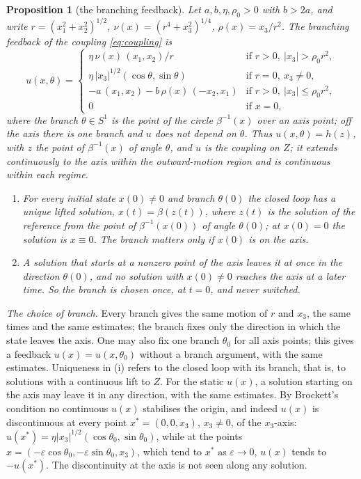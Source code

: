 \documentclass[11pt,reqno]{amsart}
\theoremstyle{plain}
\newtheorem*{proposition}{Proposition}
\theoremstyle{definition}
\theoremstyle{remark}
\begin{document}
\begin{proposition}[the branching feedback]
Let $a,b,\eta,\rho_0>0$ with $b>2a$, and write $r=(x_1^{2}+x_2^{2})^{1/2}$,
$\nu(x)=(r^{4}+x_3^{2})^{1/4}$, $\rho(x)=x_3/r^{2}$. The branching feedback of the coupling
\eqref{eq:coupling} is
\begin{equation}\label{eq:branchfb}
  u(x,\theta)=\begin{cases}
    \eta\,\nu(x)\,(x_1,x_2)/r & \text{if } r>0,\ |x_3|>\rho_0r^{2},\\[0.5ex]
    \eta\,|x_3|^{1/2}(\cos\theta,\sin\theta) & \text{if } r=0,\ x_3\neq0,\\[0.5ex]
    -a\,(x_1,x_2)-b\,\rho(x)\,(-x_2,x_1) & \text{if } r>0,\ |x_3|\le\rho_0r^{2},\\[0.5ex]
    0 & \text{if } x=0,
  \end{cases}
\end{equation}
where the branch $\theta\in S^{1}$ is the point of the circle $\beta^{-1}(x)$ over an axis point; off the axis
there is one branch and $u$ does not depend on $\theta$. Thus $u(x,\theta)=h(z)$, with $z$ the point of
$\beta^{-1}(x)$ of angle $\theta$, and $u$ is the coupling on $Z$; it extends continuously to the axis within the outward-motion region and is
continuous within each regime.
\begin{enumerate}
\item[\textup{(i)}] For every initial state $x(0)\ne0$ and branch $\theta(0)$ the closed loop has a unique
      lifted solution, $x(t)=\beta(z(t))$, where $z(t)$ is the solution of the reference from the point of
      $\beta^{-1}(x(0))$ of angle $\theta(0)$; at $x(0)=0$ the solution is $x\equiv0$. The branch matters only if $x(0)$ is on the axis.
\item[\textup{(ii)}] A solution that starts at a nonzero point of the axis leaves it at once in the direction $\theta(0)$, and no solution with $x(0)\ne0$ reaches the axis at a later time. So the branch is chosen once, at $t=0$, and never switched.
\end{enumerate}
\end{proposition}

\emph{The choice of branch.} Every branch gives the same motion of $r$ and $x_3$, the same times and the
same estimates; the branch fixes only the direction in which the state leaves the axis. One may also fix
one branch $\theta_0$ for all axis points; this gives a feedback $u(x)=u(x,\theta_0)$ without a branch
argument, with the same estimates. Uniqueness in (i) refers to the closed loop with its branch, that is, to
solutions with a continuous lift to $Z$. For the static $u(x)$, a solution starting on the axis may leave it in
any direction, with the same estimates. By Brockett's condition \cite{Brockett1983} no continuous $u(x)$
stabilises the origin, and indeed $u(x)$ is discontinuous at every point $x^{*}=(0,0,x_3)$, $x_3\neq0$, of the
$x_3$-axis: $u(x^{*})=\eta|x_3|^{1/2}(\cos\theta_0,\sin\theta_0)$, while at the points
$x=(-\varepsilon\cos\theta_0,-\varepsilon\sin\theta_0,x_3)$, which tend to $x^{*}$ as $\varepsilon\to0$, $u(x)$ tends
to $-u(x^{*})$. The discontinuity at the axis is not seen along any solution.
\end{document}
